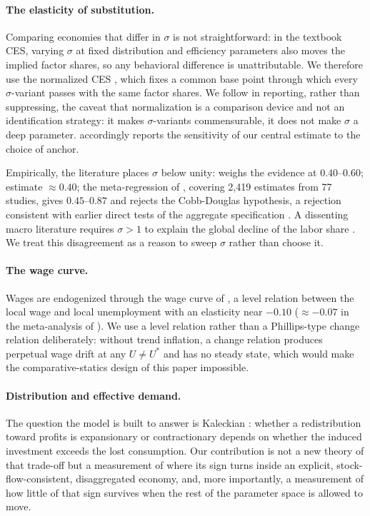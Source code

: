 \paragraph{The elasticity of substitution.}
Comparing economies that differ in $\sigma$ is not straightforward: in the textbook CES, varying $\sigma$ at fixed distribution and efficiency parameters also moves the implied factor shares, so any behavioral difference is unattributable. We therefore use the normalized CES \citep{KlumpDeLaGrandville2000,KlumpSaam2008,Klump2012}, which fixes a common base point through which every $\sigma$-variant passes with the same factor shares. We follow \citet{Temple2012} in reporting, rather than suppressing, the caveat that normalization is a comparison device and not an identification strategy: it makes $\sigma$-variants commensurable, it does not make $\sigma$ a deep parameter.  accordingly reports the sensitivity of our central estimate to the choice of anchor.

Empirically, the literature places $\sigma$ below unity: \citet{Chirinko2008} weighs the evidence at $0.40$--$0.60$; \citet{ChirinkoMallick2017} estimate $\approx 0.40$; the meta-regression of \citet{Knoblach2020}, covering 2{,}419 estimates from 77 studies, gives $0.45$--$0.87$ and rejects the Cobb-Douglas hypothesis, a rejection consistent with earlier direct tests of the aggregate specification \citep{DuffyPapageorgiou2000,Antras2004}. A dissenting macro literature requires $\sigma > 1$ to explain the global decline of the labor share \citep{KarabarbounisNeiman2014}. We treat this disagreement as a reason to sweep $\sigma$ rather than choose it.

\paragraph{The wage curve.}
Wages are endogenized through the wage curve of \citet{BlanchflowerOswald1994}, a level relation between the local wage and local unemployment with an elasticity near $-0.10$ ($\approx -0.07$ in the meta-analysis of \citealp{NijkampPoot2005}). We use a level relation rather than a Phillips-type change relation deliberately: without trend inflation, a change relation produces perpetual wage drift at any $U \neq U^{\ast}$ and has no steady state, which would make the comparative-statics design of this paper impossible.

\paragraph{Distribution and effective demand.}
The question the model is built to answer is Kaleckian \citep{Kalecki1971,BhaduriMarglin1990}: whether a redistribution toward profits is expansionary or contractionary depends on whether the induced investment exceeds the lost consumption. Our contribution is not a new theory of that trade-off but a measurement of where its sign turns inside an explicit, stock-flow-consistent, disaggregated economy, and, more importantly, a measurement of how little of that sign survives when the rest of the parameter space is allowed to move.

